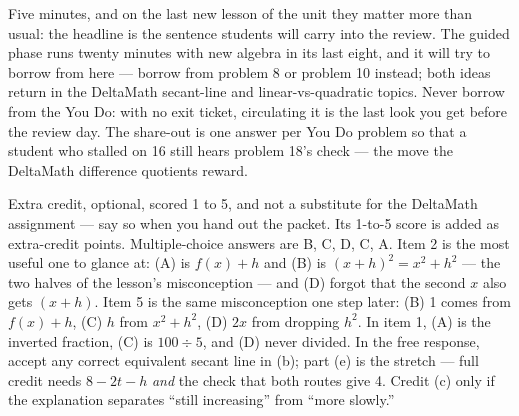 \documentclass[10pt]{article}
\begin{document}
\begin{teachernote}[Debrief]
Five minutes, and on the last new lesson of the unit they matter more than usual: the headline
is the sentence students will carry into the review. The guided phase runs twenty minutes with
new algebra in its last eight, and it will try to borrow from here --- borrow from problem 8
or problem 10 instead; both ideas return in the DeltaMath secant-line and linear-vs-quadratic
topics. Never borrow from the You Do: with no exit ticket, circulating it is the last look you
get before the review day. The share-out is one answer per You Do problem so that a student who
stalled on 16 still hears problem 18's check --- the move the DeltaMath difference quotients
reward.
\end{teachernote}

\begin{teachernote}[AP Practice]
Extra credit, optional, scored 1 to 5, and not a substitute for the DeltaMath assignment --- say so when you
hand out the packet. Its 1-to-5 score is added as extra-credit points. Multiple-choice answers are B, C, D,
C, A. Item 2 is the most useful one to glance at: (A) is $f(x) + h$ and (B) is
$(x + h)^2 = x^2 + h^2$ --- the two halves of the lesson's misconception --- and (D) forgot
that the second $x$ also gets $(x + h)$. Item 5 is the same misconception one step later: (B)
1 comes from $f(x) + h$, (C) $h$ from $x^2 + h^2$, (D) $2x$ from dropping $h^2$. In item 1, (A)
is the inverted fraction, (C) is $100 \div 5$, and (D) never divided. In the free response,
accept any correct equivalent secant line in (b); part (e) is the stretch --- full credit needs
$8 - 2t - h$ \emph{and} the check that both routes give 4. Credit (c) only if the explanation
separates ``still increasing'' from ``more slowly.''
\end{teachernote}
\end{document}
